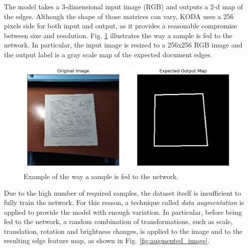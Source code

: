 \documentclass[a4paper]{article}
\begin{document}
The model takes a 3-dimensional input image (RGB) and outputs a 2-d map of the edges. Although the shape
of those matrices can vary, KODA uses a 256 pixels side for both input and output, as it provides a reasonable compromise between size and resolution. Fig. \ref{fig:label_edge} illustrates the way a
sample is fed to the network. In particular, the input image is resized to a 256x256 RGB image and the
output label is a gray scale map of the expected document edges.

\begin{figure}[htb!]
	\includegraphics[width=\linewidth]{label_edge.png}
	\caption{Example of the way a sample is fed to the network.}
	\label{fig:label_edge}
\end{figure}

Due to the high number of required samples, the dataset itself is insufficient to fully train the network.
For this reason, a technique called \textit{data augmentation} is applied to provide the model
with enough variation. In particular, before being fed to the network, a random combination of transformations, such as scale, translation, rotation and brightness changes, is applied to the image and to the resulting edge feature map, as shown in Fig. \ref{fig:augmented_image}.
\end{document}
